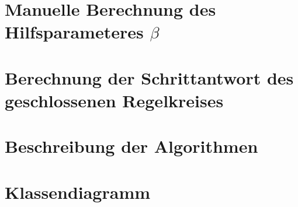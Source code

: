 \clearpage
\section{Manuelle Berechnung des Hilfsparameteres $\beta$}
\label{app:beta}


\clearpage
\section{Berechnung der Schrittantwort des geschlossenen Regelkreises}
\label{app:fft}


\clearpage
\section{Beschreibung der Algorithmen}
\label{app:algos}


\clearpage
\section{Klassendiagramm}
\clearpage
\label{app:classdiagram}
%
